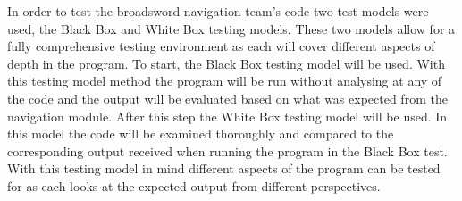 In order to test the broadsword navigation team’s code two test models were used, the Black Box and White Box testing models.
These two models allow for a fully comprehensive testing environment as each will cover different aspects of depth in the program.
To start, the Black Box testing model will be used. With this testing model method the program will be run without analysing at any of the code
and the output will be evaluated based on what was expected from the navigation module. After this step the White Box testing model will be used.
In this model the code will be examined thoroughly and compared to the corresponding output received when running the program in the Black Box test.
With this testing model in mind different aspects of the program can be tested for as each looks at the expected output from different perspectives.




